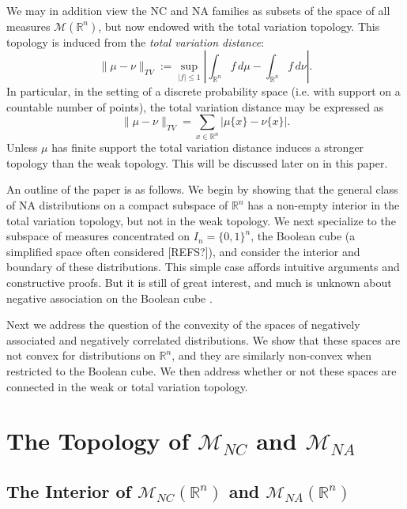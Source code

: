 \documentclass[11pt]{article}
\newcommand{\R}{\mathbb{R}}
\newcommand{\m}{\mathcal{M}}
\begin{document}
We may in addition view the NC and NA families as subsets of the space of all measures $\m(\R^n)$, but now endowed with the total variation topology. This topology is induced from the  
{\it total variation distance}:
\[
\lVert \mu-\nu\rVert_{TV} := \sup_{|f|\leq 1} \left| \int_{\R^n} f
\, d\mu - \int_{\R^n} f \, d\nu\right|.
\]
In particular, in the setting of a discrete probability space (i.e. with support on a countable number of points), the total variation distance may be expressed as 
\begin{equation}\label{TVdiscrete}
\lVert \mu-\nu\rVert_{TV} = \sum_{x\in \R^n} |\mu\{x\} - \nu\{x\}|.
\end{equation}
Unless $\mu$ has finite support the total variation distance induces a stronger topology than the weak topology. This will be discussed later on in this paper.



An outline of the paper is as follows. 
We begin by showing
that the general class of NA distributions
on a compact subspace of $\R^n$ has a non-empty interior in the total variation topology, but not in the weak topology. We next specialize to 
the subspace of measures concentrated on $I_n=\{0,1\}^n$, the Boolean cube (a simplified space often considered [REFS?]), and consider
the interior and boundary of these distributions. This simple case affords intuitive arguments and constructive proofs. But it is still of great interest, and much is unknown about negative association on the Boolean cube \cite{pemantle,peres}.

Next we address the question of the convexity of the spaces of negatively associated and negatively correlated distributions. We show that these spaces are not convex for distributions on $\R^n$, and they are similarly non-convex when restricted to the Boolean cube. We then address whether or not these spaces are connected in the weak or total variation topology. 


\section{The Topology of $\m_{NC}$ and $\m_{NA}$}

\subsection{The Interior of $\m_{NC}(\R^n)$ and $\m_{NA}(\R^n)$}
\end{document}
